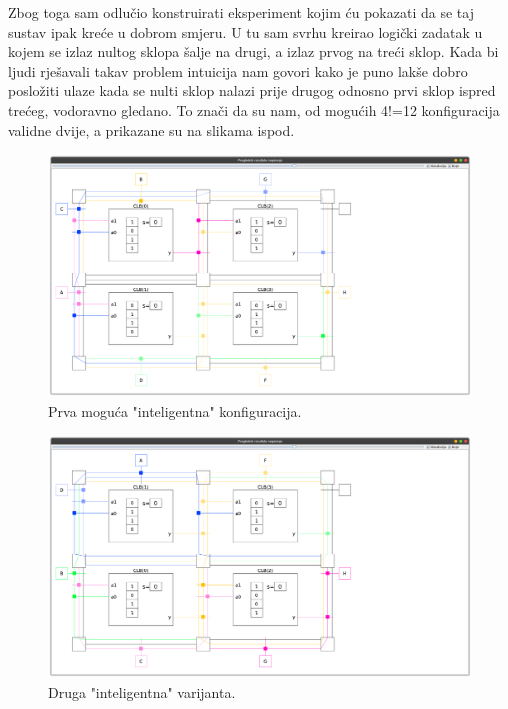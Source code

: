 \documentclass[times, utf8, zavrsni]{fer}
\begin{document}
		Zbog toga sam odlučio konstruirati eksperiment kojim ću pokazati da se taj sustav ipak kreće u dobrom smjeru. U tu sam svrhu kreirao logički zadatak u kojem se izlaz nultog sklopa šalje na drugi, a izlaz prvog na treći sklop. Kada bi ljudi rješavali takav problem intuicija nam govori kako je puno lakše dobro posložiti ulaze kada se nulti sklop nalazi prije drugog odnosno prvi sklop ispred trećeg, vodoravno gledano. To znači da su nam, od mogućih 4!=12 konfiguracija validne dvije, a prikazane su na slikama ispod.
		
		
		\begin{figure}[H]
			\centering
			\includegraphics[width=18cm]{slike/conf1.png}
			\caption{Prva moguća "inteligentna" konfiguracija. }
			\label{fig:conf1}
		\end{figure} 
		
		
		\begin{figure}[H]
			\centering
			\includegraphics[width=18cm]{slike/conf2.png}
			\caption{Druga "inteligentna" varijanta. }
			\label{fig:conf2}
		\end{figure} 
		
\end{document}
